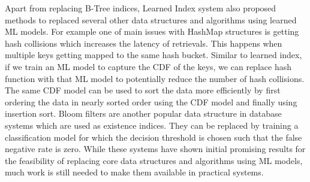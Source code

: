 Apart from replacing B-Tree indices, Learned Index system also proposed methods to replaced several other data structures and algorithms using learned ML models.
For example one of main issues with HashMap structures is getting hash collisions which increases the latency of retrievals.
This happens when multiple keys getting mapped to the same hash bucket.
Similar to learned index, if we train an ML model to capture the CDF of the keys, we can replace hash function with that ML model to potentially reduce the number of hash collisions.
The same CDF model can be used to sort the data more efficiently by first ordering the data in nearly sorted order using the CDF model and finally using insertion sort.
Bloom filters are another popular data structure in database systems which are used as existence indices.
They can be replaced by training a classification model for which the decision threshold is chosen such that the false negative rate is zero.
While these systems have shown initial promising results for the feasibility of replacing core data structures and algorithms using ML models, much work is still needed to make them available in practical systems.
